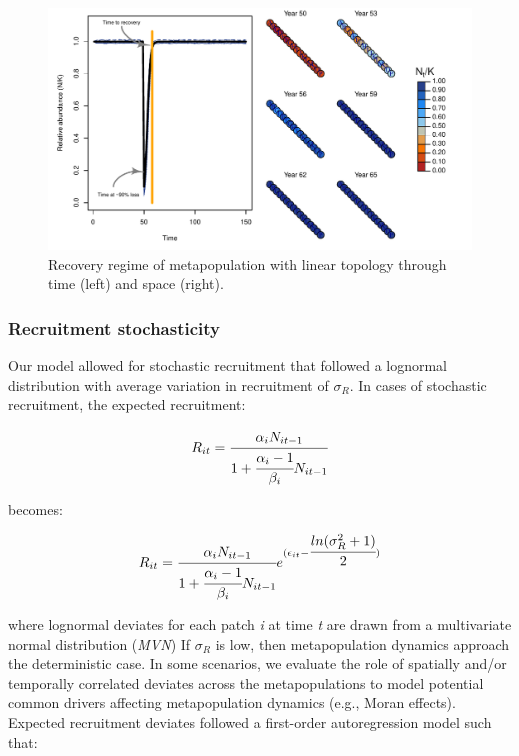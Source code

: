 \documentclass[]{article}
\begin{document}
\begin{figure}[H]

{\centering \includegraphics{Managing_for_ecological_surprises_in_metapopulations_files/figure-latex/example disturbance regime-1} 

}

\caption{Recovery regime of metapopulation with linear topology through time (left) and space (right).}\label{fig:example disturbance regime}
\end{figure}

\hypertarget{recruitment-stochasticity}{%
\subsubsection{Recruitment
stochasticity}\label{recruitment-stochasticity}}

Our model allowed for stochastic recruitment that followed a lognormal
distribution with average variation in recruitment of \(\sigma_R\). In
cases of stochastic recruitment, the expected recruitment:

\begin{align}
R_{it}=\cfrac{\alpha_iN_{it-1}}{1+\cfrac{\alpha_i-1}{\beta_i}N_{it-1}}
\end{align}

becomes:

\begin{align}
R_{it}=\cfrac{\alpha_iN_{it-1}}{1+\cfrac{\alpha_i-1}{\beta_i}N_{it-1}}e^{(\epsilon_{it}-\cfrac{ln(\sigma_{R}^2+1)}{2})}
\end{align}

where lognormal deviates for each patch \emph{i} at time \emph{t} are
drawn from a multivariate normal distribution (\emph{MVN}) If
\(\sigma_R\) is low, then metapopulation dynamics approach the
deterministic case. In some scenarios, we evaluate the role of spatially
and/or temporally correlated deviates across the metapopulations to
model potential common drivers affecting metapopulation dynamics (e.g.,
Moran effects). Expected recruitment deviates followed a first-order
autoregression model such that:
\end{document}
